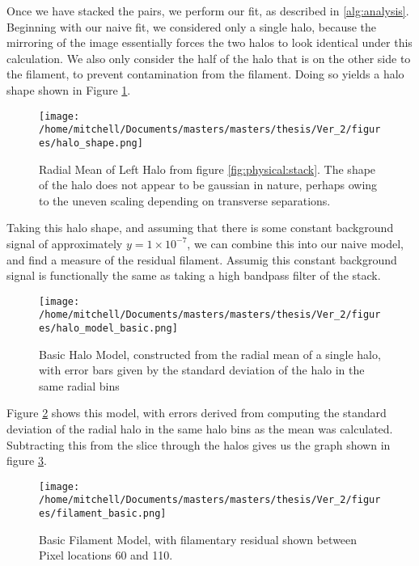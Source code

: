 Once we have stacked the pairs, we perform our fit, as described in \ref{alg:analysis}. Beginning with our naive fit, we considered only a single halo, because the mirroring of the image essentially forces the two halos to look identical under this calculation. We also only consider the half of the halo that is on the other side to the filament, to prevent contamination from the filament. Doing so yields a halo shape shown in Figure \ref{fig:halo:single}.

\begin{figure}[H]
\centering
\texttt{[image: /home/mitchell/Documents/masters/masters/thesis/Ver\_2/figures/halo\_shape.png]}
\caption{ Radial Mean of Left Halo from figure \ref{fig:physical:stack}. The shape of the halo does not appear to be gaussian in nature, perhaps owing to the uneven scaling depending on transverse separations. }
\label{fig:halo:single}
\end{figure}

Taking this halo shape, and assuming that there is some constant background signal of approximately $y = 1\times 10^{-7}$, we can combine this into our naive model, and find a measure of the residual filament. Assumig this constant background signal is functionally the same as taking a high bandpass filter of the stack. 


\begin{figure}[H]
\centering
\texttt{[image: /home/mitchell/Documents/masters/masters/thesis/Ver\_2/figures/halo\_model\_basic.png]}
\caption{ Basic Halo Model, constructed from the radial mean of a single halo, with error bars given by the standard deviation of the halo in the same radial bins }
\label{fig:halo:basic_model}
\end{figure}

Figure \ref{fig:halo:basic_model} shows this model, with errors derived from computing the standard deviation of the radial halo in the same halo bins as the mean was calculated. Subtracting this from the slice through the halos gives us the graph shown in figure \ref{fig:halo:basic_filament}.

\begin{figure}[H]
\centering
\texttt{[image: /home/mitchell/Documents/masters/masters/thesis/Ver\_2/figures/filament\_basic.png]}
\caption{ Basic Filament Model, with filamentary residual shown between Pixel locations 60 and 110. }
\label{fig:halo:basic_filament}
\end{figure}

